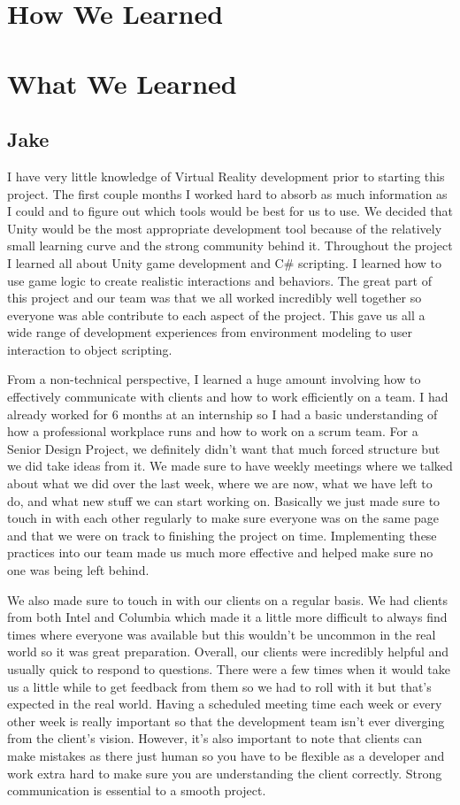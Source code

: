\documentclass[10pt,journal,compsoc,onecolumn, draftclsnofoot]{IEEEtran}
\begin{document}
\section{How We Learned}

\section{What We Learned}
\subsection{Jake}
I have very little knowledge of Virtual Reality development prior to starting this project. The first couple months I worked hard to absorb as much information as I could and to figure out which tools would be best for us to use. We decided that Unity would be the most appropriate development tool because of the relatively small learning curve and the strong community behind it. Throughout the project I learned all about Unity game development and C\# scripting. I learned how to use game logic to create realistic interactions and behaviors. The great part of this project and our team was that we all worked incredibly well together so everyone was able contribute to each aspect of the project. This gave us all a wide range of development experiences from environment modeling to user interaction to object scripting.

From a non-technical perspective, I learned a huge amount involving how to effectively communicate with clients and how to work efficiently on a team. I had already worked for 6 months at an internship so I had a basic understanding of how a professional workplace runs and how to work on a scrum team. For a Senior Design Project, we definitely didn’t want that much forced structure but we did take ideas from it. We made sure to have weekly meetings where we talked about what we did over the last week, where we are now, what we have left to do, and what new stuff we can start working on. Basically we just made sure to touch in with each other regularly to make sure everyone was on the same page and that we were on track to finishing the project on time. Implementing these practices into our team made us much more effective and helped make sure no one was being left behind.

We also made sure to touch in with our clients on a regular basis. We had clients from both Intel and Columbia which made it a little more difficult to always find times where everyone was available but this wouldn’t be uncommon in the real world so it was great preparation. Overall, our clients were incredibly helpful and usually quick to respond to questions. There were a few times when it would take us a little while to get feedback from them so we had to roll with it but that’s expected in the real world. Having a scheduled meeting time each week or every other week is really important so that the development team isn’t ever diverging from the client’s vision. However, it’s also important to note that clients can make mistakes as there just human so you have to be flexible as a developer and work extra hard to make sure you are understanding the client correctly. Strong communication is essential to a smooth project.
\end{document}
